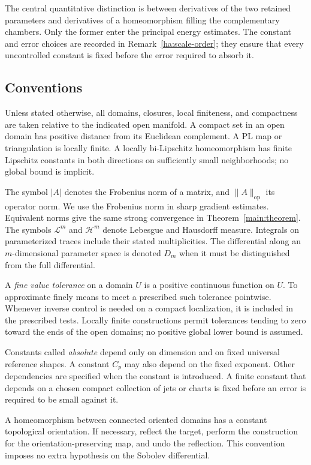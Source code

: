 \documentclass[11pt]{article}
\numberwithin{equation}{section}
\theoremstyle{definition}
\theoremstyle{remark}
\begin{document}
The central quantitative distinction is between derivatives of the
two retained parameters and derivatives of a homeomorphism filling
the complementary chambers.  Only the former enter the principal
energy estimates.  The constant and error choices are recorded in
Remark~\ref{ha:scale-order}; they ensure that every uncontrolled
constant is fixed before the error required to absorb it.

\subsection{Conventions}

Unless stated otherwise, all domains, closures, local finiteness, and compactness are taken relative to the indicated open manifold. A compact set in an open domain has positive distance from its Euclidean complement. A PL map or triangulation is locally finite. A locally bi-Lipschitz homeomorphism has finite Lipschitz constants in both directions on sufficiently small neighborhoods; no global bound is implicit.

The symbol $|A|$ denotes the Frobenius norm of a matrix, and $\|A\|_{\mathrm{op}}$ its operator norm. We use the Frobenius norm in sharp gradient estimates. Equivalent norms give the same strong convergence in Theorem~\ref{main:theorem}. The symbols $\mathcal L^m$ and $\mathcal H^m$ denote Lebesgue and Hausdorff measure. Integrals on parameterized traces include their stated multiplicities. The differential along an $m$-dimensional parameter space is denoted $D_m$ when it must be distinguished from the full differential.

A \emph{fine value tolerance} on a domain $U$ is a positive continuous function on $U$. To approximate finely means to meet a prescribed such tolerance pointwise. Whenever inverse control is needed on a compact localization, it is included in the prescribed tests. Locally finite constructions permit tolerances tending to zero toward the ends of the open domains; no positive global lower bound is assumed.

Constants called \emph{absolute} depend only on dimension and on fixed universal reference shapes. A constant $C_p$ may also depend on the fixed exponent. Other dependencies are specified when the constant is introduced. A finite constant that depends on a chosen compact collection of jets or charts is fixed before an error is required to be small against it.

A homeomorphism between connected oriented domains has a constant topological orientation. If necessary, reflect the target, perform the construction for the orientation-preserving map, and undo the reflection. This convention imposes no extra hypothesis on the Sobolev differential.
\end{document}
